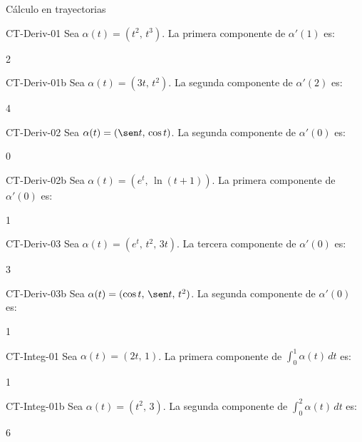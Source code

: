 \documentclass[a4,11pt]{aleph-notas}
\begin{document}
\begin{quiz}{Cálculo en trayectorias}

\begin{numerical}[tolerance=0.01]%
    {CT-Deriv-01}
    Sea $\alpha(t)=(t^2,\, t^3)$. La primera componente de $\alpha'(1)$ es:
    \item 2
\end{numerical}

\begin{numerical}[tolerance=0.01]%
    {CT-Deriv-01b}
    Sea $\alpha(t)=(3t,\, t^2)$. La segunda componente de $\alpha'(2)$ es:
    \item 4
\end{numerical}

\begin{numerical}[tolerance=0.01]%
    {CT-Deriv-02}
    Sea $\alpha(t)=(\sen t,\, \cos t)$. La segunda componente de $\alpha'(0)$ es:
    \item 0
\end{numerical}

\begin{numerical}[tolerance=0.01]%
    {CT-Deriv-02b}
    Sea $\alpha(t)=(e^t,\, \ln(t+1))$. La primera componente de $\alpha'(0)$ es:
    \item 1
\end{numerical}

\begin{numerical}[tolerance=0.01]%
    {CT-Deriv-03}
    Sea $\alpha(t)=(e^t,\, t^2,\, 3t)$. La tercera componente de $\alpha'(0)$ es:
    \item 3
\end{numerical}

\begin{numerical}[tolerance=0.01]%
    {CT-Deriv-03b}
    Sea $\alpha(t)=(\cos t,\, \sen t,\, t^2)$. La segunda componente de $\alpha'(0)$ es:
    \item 1
\end{numerical}

\begin{numerical}[tolerance=0.01]%
    {CT-Integ-01}
    Sea $\alpha(t)=(2t,\, 1)$. La primera componente de $\displaystyle\int_0^1 \alpha(t)\,dt$ es:
    \item 1
\end{numerical}

\begin{numerical}[tolerance=0.01]%
    {CT-Integ-01b}
    Sea $\alpha(t)=(t^2,\, 3)$. La segunda componente de $\displaystyle\int_0^2 \alpha(t)\,dt$ es:
    \item 6
\end{numerical}


\end{quiz}
\end{document}
